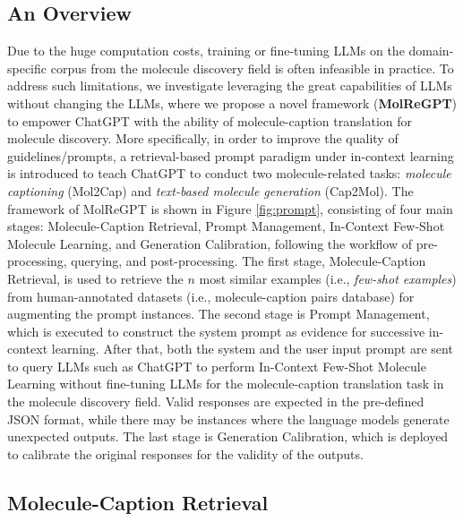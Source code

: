 \documentclass{article}
\theoremstyle{plain}
\theoremstyle{definition}
\theoremstyle{remark}
\begin{document}
\subsection{An Overview}

Due to the huge computation costs, training or fine-tuning LLMs on the domain-specific corpus from the molecule discovery field is often infeasible in practice.
To address such limitations, we investigate leveraging the great capabilities of LLMs without changing the LLMs, where we propose a novel framework (\textbf{MolReGPT}) to empower ChatGPT with the ability of molecule-caption translation for molecule discovery. 
More specifically, in order to improve the quality of guidelines/prompts, a retrieval-based prompt paradigm under in-context learning is introduced to teach ChatGPT to conduct two molecule-related tasks: \textit{molecule captioning} (Mol2Cap) and \textit{text-based molecule generation} (Cap2Mol).
The framework of MolReGPT is shown in Figure \ref{fig:prompt}, consisting of four main stages: Molecule-Caption Retrieval, Prompt Management, In-Context Few-Shot Molecule Learning, and Generation Calibration, following the workflow of pre-processing, querying, and post-processing. The first stage, Molecule-Caption Retrieval, is used to retrieve the \(n\) most similar examples (i.e., \emph{few-shot examples}) from human-annotated datasets (i.e., molecule-caption pairs database) for augmenting the prompt instances.
The second stage is Prompt Management, which is executed to construct the system prompt as evidence for successive in-context learning.
After that, both the system and the user input prompt are sent to query LLMs such as ChatGPT to perform In-Context Few-Shot Molecule Learning without fine-tuning LLMs for the molecule-caption translation task in the molecule discovery field. 
Valid responses are expected in the pre-defined JSON format, while there may be instances where the language models generate unexpected outputs. 
The last stage is Generation Calibration, which is deployed to calibrate the original responses for the validity of the outputs.



\subsection{Molecule-Caption Retrieval}
\end{document}
